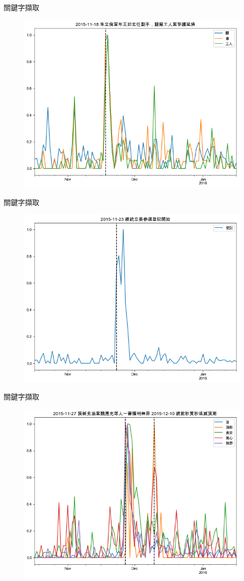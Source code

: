 \documentclass{beamer}
\begin{document}
\begin{CJK}{UTF8}{bkai}
\begin{frame}{關鍵字擷取}
\begin{figure}
  \includegraphics[width=.7\textwidth, height=.7\textheight, keepaspectratio]{ts05}
\end{figure}
\end{frame}

\begin{frame}{關鍵字擷取}
\begin{figure}
  \includegraphics[width=.7\textwidth, height=.7\textheight, keepaspectratio]{ts06}
\end{figure}
\end{frame}

\begin{frame}{關鍵字擷取}
\begin{figure}
  \includegraphics[width=.7\textwidth, height=.7\textheight, keepaspectratio]{ts07}
\end{figure}
\end{frame}


\end{CJK}
\end{document}
